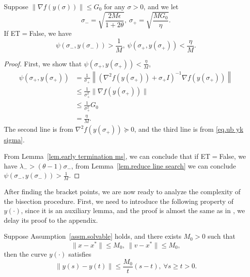 \documentclass{mcom-l}
\numberwithin{equation}{section}
\begin{document}
\begin{lemma}
    \label{lem.bracketing points}
    Suppose $\|\nabla f(y(\sigma))\|\leq G_0$ for any $\sigma>0$, and we let
    \begin{equation}
        \label{eq.bracket points}
        \sigma_- = \sqrt{\frac{2M\epsilon}{1+2\theta}}, \ \sigma_+ = \sqrt{\frac{MG_0}{\eta}}.
    \end{equation}
    If ET$=$False, we have
    \begin{equation*}
        \psi\left (\sigma_-,y(\sigma_-)\right) >\frac{1}{M}, \ \psi\left (\sigma_+,y(\sigma_+)\right) <\frac{\eta}{M}.
    \end{equation*}
\end{lemma}
\begin{proof}
    First, we show that $\psi(\sigma_+,y(\sigma_+))<\frac{\eta}{M}$,
    \begin{equation*}
        \begin{aligned}
            \psi(\sigma_+,y(\sigma_+)) & = \frac{1}{\sigma_+}\left \|\left(\nabla^2 f(y(\sigma_+))+\sigma_+ I\right)^{-1}\nabla f(y(\sigma_+))\right\| \\
                                       & \leq \frac{1}{\sigma_+^2}\|\nabla f(y(\sigma_+))\|                                                            \\
                                       & \leq \frac{1}{\sigma_+^2} G_0                                                                                 \\
                                       & = \frac{\eta}{M}.
        \end{aligned}
    \end{equation*}
    The second line is from $\nabla^2 f(y(\sigma_+))\succeq 0$, and the third line is from \eqref{eq.ub yk sigma}.

    From Lemma~\ref{lem.early termination ms}, we can conclude that if ET$=$False, we have $\lambda_- > (\theta-1)\sigma_-$, from Lemma~\ref{lem.reduce line search} we can conclude $\psi(\sigma_-,y(\sigma_-))>\frac{1}{M}.$
\end{proof}
After finding the bracket points, we are now ready to analyze the complexity of the bisection procedure. First, we need to introduce the following property of $y(\cdot)$, since it is an auxiliary lemma, and the proof is almost the same as in \citet{monteiro2013accelerated}, we delay its proof to the appendix.
\begin{lemma}
    \label{lem.curve condition}
    Suppose Assumption~\ref{assm.solvable} holds, and there exists $M_0>0$ such that
    \begin{equation}\label{eq.bounded assm point}
        \|x-x^*\|\leq M_0, \ \|v-x^*\|\leq M_0,
    \end{equation}
    then the curve $y(\cdot)$ satisfies
    \begin{equation}
        \label{eq.curve condition}
        \|y(s)-y(t)\| \leq \frac{M_0}{t}(s-t), \ \forall s\geq t >0.
    \end{equation}
\end{lemma}
\end{document}
